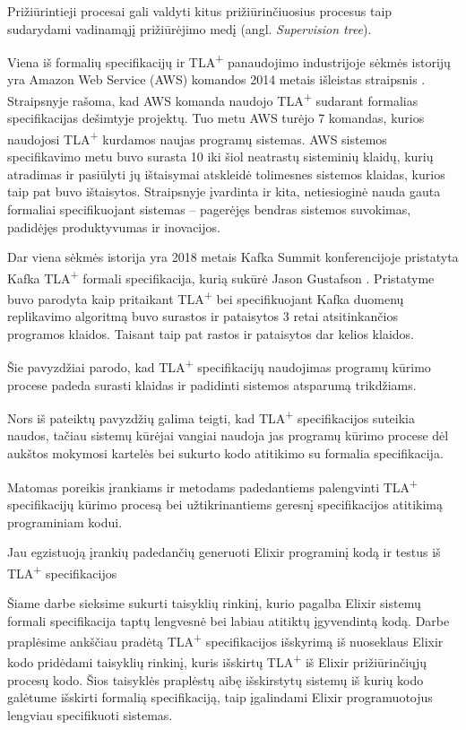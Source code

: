 \documentclass{VUMIFPSmagistrinis}
\begin{document}
        Prižiūrintieji procesai gali valdyti kitus prižiūrinčiuosius procesus taip sudarydami vadinamąjį
        prižiūrėjimo medį (angl. {\it Supervision tree}).

		Viena iš formalių specifikacijų ir TLA\textsuperscript{+} panaudojimo industrijoje sėkmės istorijų yra Amazon Web Service (AWS) komandos 2014 metais išleistas straipsnis \cite{newcombe2014use}.
		Straipsnyje rašoma, kad AWS komanda naudojo TLA\textsuperscript{+} sudarant formalias specifikacijas dešimtyje projektų. Tuo metu AWS turėjo 7 komandas, kurios naudojosi TLA\textsuperscript{+} kurdamos naujas programų sistemas.
		AWS sistemos specifikavimo metu buvo surasta 10 iki šiol neatrastų sisteminių klaidų, kurių atradimas ir pasiūlyti jų ištaisymai atskleidė tolimesnes sistemos klaidas, kurios taip pat buvo ištaisytos.
		Straipsnyje įvardinta ir kita, netiesioginė nauda gauta formaliai specifikuojant sistemas -- pagerėjęs bendras sistemos suvokimas, padidėjęs produktyvumas ir inovacijos.
		
		Dar viena sėkmės istorija yra 2018 metais Kafka Summit konferencijoje pristatyta Kafka TLA\textsuperscript{+} formali specifikacija, kurią sukūrė Jason Gustafson \cite{kfkTla}.
		Pristatyme buvo parodyta kaip pritaikant TLA\textsuperscript{+} bei specifikuojant Kafka duomenų replikavimo algoritmą buvo surastos ir pataisytos 3 retai atsitinkančios programos klaidos.
		Taisant taip pat rastos ir pataisytos dar kelios klaidos.

        Šie pavyzdžiai parodo, kad TLA\textsuperscript{+} specifikacijų naudojimas programų kūrimo procese padeda surasti klaidas ir padidinti sistemos atsparumą trikdžiams.

        Nors iš pateiktų pavyzdžių galima teigti, kad TLA\textsuperscript{+} specifikacijos suteikia naudos, tačiau sistemų kūrėjai vangiai naudoja jas programų kūrimo procese dėl aukštos mokymosi
        kartelės bei sukurto kodo atitikimo su formalia specifikacija.

        Matomas poreikis įrankiams ir metodams padedantiems palengvinti TLA\textsuperscript{+} specifikacijų kūrimo procesą bei užtikrinantiems geresnį specifikacijos atitikimą programiniam kodui. 

        Jau egzistuoją įrankių padedančių generuoti Elixir programinį kodą ir testus iš TLA\textsuperscript{+} specifikacijos \cite{extest}

        Šiame darbe sieksime sukurti taisyklių rinkinį, kurio pagalba Elixir sistemų formali specifikacija taptų lengvesnė bei labiau atitiktų įgyvendintą kodą.
        Darbe praplėsime ankščiau pradėtą TLA\textsuperscript{+} specifikacijos išskyrimą iš nuoseklaus Elixir kodo pridėdami taisyklių rinkinį, kuris išskirtų TLA\textsuperscript{+} iš Elixir prižiūrinčiųjų procesų kodo. 
        Šios taisyklės praplėstų aibę išskirstytų sistemų iš kurių kodo galėtume išskirti formalią specifikaciją, taip įgalindami Elixir programuotojus lengviau specifikuoti sistemas.
\end{document}
